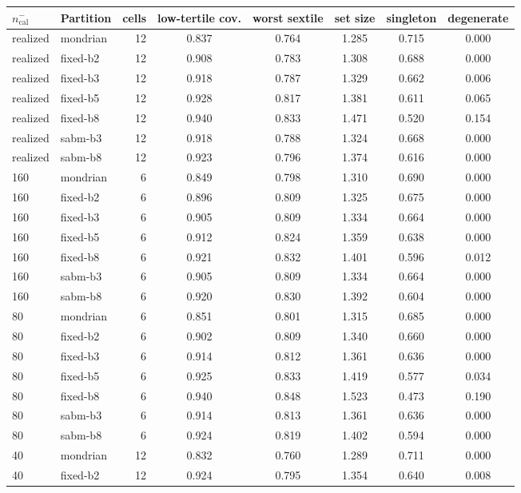 \begin{tabular}{llrccccc}
\toprule
$n^{-}_{\mathrm{cal}}$ & Partition & cells & low-tertile cov. & worst sextile & set size & singleton & degenerate\\
\midrule
realized & mondrian & 12 & 0.837 & 0.764 & 1.285 & 0.715 & 0.000\\
realized & fixed-b2 & 12 & 0.908 & 0.783 & 1.308 & 0.688 & 0.000\\
realized & fixed-b3 & 12 & 0.918 & 0.787 & 1.329 & 0.662 & 0.006\\
realized & fixed-b5 & 12 & 0.928 & 0.817 & 1.381 & 0.611 & 0.065\\
realized & fixed-b8 & 12 & 0.940 & 0.833 & 1.471 & 0.520 & 0.154\\
realized & sabm-b3 & 12 & 0.918 & 0.788 & 1.324 & 0.668 & 0.000\\
realized & sabm-b8 & 12 & 0.923 & 0.796 & 1.374 & 0.616 & 0.000\\
\midrule
160 & mondrian & 6 & 0.849 & 0.798 & 1.310 & 0.690 & 0.000\\
160 & fixed-b2 & 6 & 0.896 & 0.809 & 1.325 & 0.675 & 0.000\\
160 & fixed-b3 & 6 & 0.905 & 0.809 & 1.334 & 0.664 & 0.000\\
160 & fixed-b5 & 6 & 0.912 & 0.824 & 1.359 & 0.638 & 0.000\\
160 & fixed-b8 & 6 & 0.921 & 0.832 & 1.401 & 0.596 & 0.012\\
160 & sabm-b3 & 6 & 0.905 & 0.809 & 1.334 & 0.664 & 0.000\\
160 & sabm-b8 & 6 & 0.920 & 0.830 & 1.392 & 0.604 & 0.000\\
\midrule
80 & mondrian & 6 & 0.851 & 0.801 & 1.315 & 0.685 & 0.000\\
80 & fixed-b2 & 6 & 0.902 & 0.809 & 1.340 & 0.660 & 0.000\\
80 & fixed-b3 & 6 & 0.914 & 0.812 & 1.361 & 0.636 & 0.000\\
80 & fixed-b5 & 6 & 0.925 & 0.833 & 1.419 & 0.577 & 0.034\\
80 & fixed-b8 & 6 & 0.940 & 0.848 & 1.523 & 0.473 & 0.190\\
80 & sabm-b3 & 6 & 0.914 & 0.813 & 1.361 & 0.636 & 0.000\\
80 & sabm-b8 & 6 & 0.924 & 0.819 & 1.402 & 0.594 & 0.000\\
\midrule
40 & mondrian & 12 & 0.832 & 0.760 & 1.289 & 0.711 & 0.000\\
40 & fixed-b2 & 12 & 0.924 & 0.795 & 1.354 & 0.640 & 0.008\\

\end{tabular}

